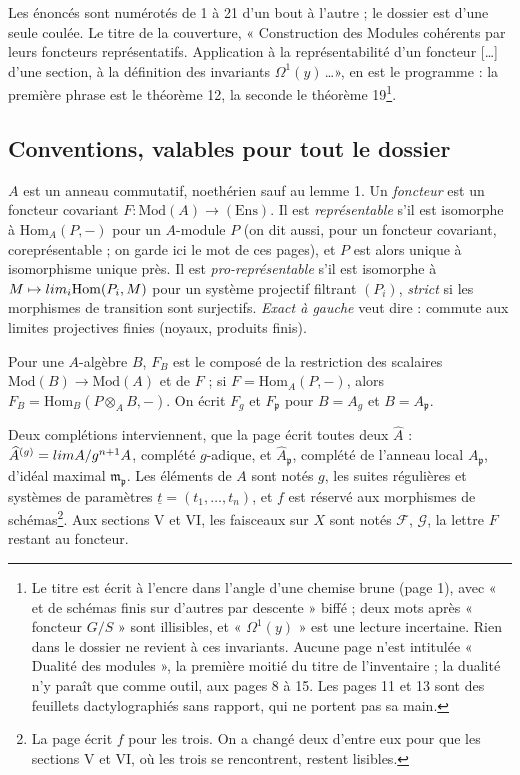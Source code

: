 \documentclass[11pt,a4paper]{article}
\begin{document}
Les énoncés sont numérotés de 1 à 21 d'un bout à l'autre ; le dossier est
d'une seule coulée. Le titre de la couverture, « Construction des Modules
cohérents par leurs foncteurs représentatifs. Application à la
représentabilité d'un foncteur [\ldots] d'une section, à la définition des
invariants $\Omega^{1}(y)$\,\ldots », en est le programme : la première
phrase est le théorème 12, la seconde le théorème 19\footnote{Le titre est
écrit à l'encre dans l'angle d'une chemise brune (page 1), avec « et de schémas
finis sur d'autres par descente » biffé ; deux mots après « foncteur $G/S$ »
sont illisibles, et « $\Omega^{1}(y)$ » est une lecture incertaine. Rien dans
le dossier ne revient à ces invariants. Aucune page n'est intitulée « Dualité
des modules », la première moitié du titre de l'inventaire ; la dualité n'y
paraît que comme outil, aux pages 8 à 15. Les pages 11 et 13 sont des
feuillets dactylographiés sans rapport, qui ne portent pas sa main.}.

\subsection*{Conventions, valables pour tout le dossier}

$A$ est un anneau commutatif, noethérien sauf au lemme 1. Un \emph{foncteur}
est un foncteur covariant $F \colon \mathrm{Mod}(A) \to (\mathrm{Ens})$. Il est
\emph{représentable} s'il est isomorphe à $\mathrm{Hom}_A(P, -)$ pour un
$A$-module $P$ (on dit aussi, pour un foncteur covariant, coreprésentable ;
on garde ici le mot de ces pages), et $P$ est alors unique à
isomorphisme unique près. Il est \emph{pro-représentable} s'il est isomorphe à
$M \mapsto \varinjlim_i \mathrm{Hom}(P_i, M)$ pour un système projectif
filtrant $(P_i)$, \emph{strict} si les morphismes de transition sont
surjectifs. \emph{Exact à gauche} veut dire : commute aux limites projectives
finies (noyaux, produits finis).

Pour une $A$-algèbre $B$, $F_B$ est le composé de la restriction des scalaires
$\mathrm{Mod}(B) \to \mathrm{Mod}(A)$ et de $F$ ; si $F = \mathrm{Hom}_A(P, -)$,
alors $F_B = \mathrm{Hom}_B(P \otimes_A B, -)$. On écrit $F_g$ et
$F_{\mathfrak{p}}$ pour $B = A_g$ et $B = A_{\mathfrak{p}}$.

Deux complétions interviennent, que la page écrit toutes deux
$\widehat{A}$ : $\widehat{A}^{(g)} = \varprojlim A/g^{n+1}A$, complété
$g$-adique, et $\widehat{A}_{\mathfrak{p}}$, complété de l'anneau local
$A_{\mathfrak{p}}$, d'idéal maximal $\mathfrak{m}_{\mathfrak{p}}$. Les éléments
de $A$ sont notés $g$, les suites régulières et systèmes de paramètres
$\underline{t} = (t_1, \ldots, t_n)$, et $f$ est réservé aux morphismes de
schémas\footnote{La page écrit $f$ pour les trois. On a changé deux d'entre
eux pour que les sections V et VI, où les trois se rencontrent, restent
lisibles.}. Aux sections V et VI, les faisceaux sur $X$ sont notés
$\mathcal{F}$, $\mathcal{G}$, la lettre $F$ restant au foncteur.
\end{document}
